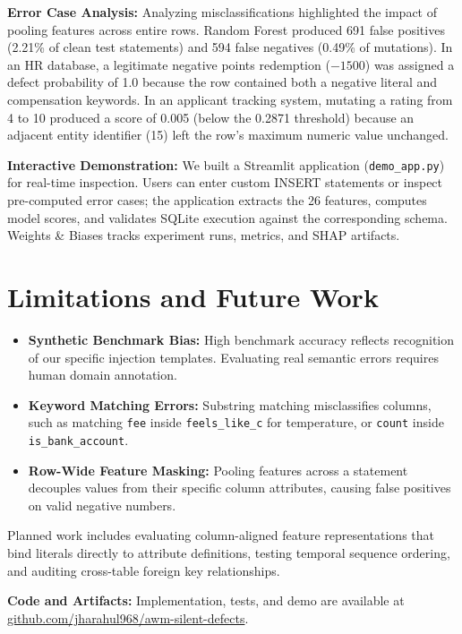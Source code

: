 \documentclass[conference]{IEEEtran}
\begin{document}
\textbf{Error Case Analysis:} Analyzing misclassifications highlighted the impact of pooling features across entire rows. Random Forest produced 691 false positives (2.21\% of clean test statements) and 594 false negatives (0.49\% of mutations). In an HR database, a legitimate negative points redemption ($-1500$) was assigned a defect probability of 1.0 because the row contained both a negative literal and compensation keywords. In an applicant tracking system, mutating a rating from 4 to 10 produced a score of 0.005 (below the 0.2871 threshold) because an adjacent entity identifier (15) left the row's maximum numeric value unchanged.

\textbf{Interactive Demonstration:} We built a Streamlit application (\texttt{demo\_app.py}) for real-time inspection. Users can enter custom INSERT statements or inspect pre-computed error cases; the application extracts the 26 features, computes model scores, and validates SQLite execution against the corresponding schema. Weights \& Biases tracks experiment runs, metrics, and SHAP artifacts.

\section{Limitations and Future Work}
\begin{itemize}
    \item \textbf{Synthetic Benchmark Bias:} High benchmark accuracy reflects recognition of our specific injection templates. Evaluating real semantic errors requires human domain annotation.
    \item \textbf{Keyword Matching Errors:} Substring matching misclassifies columns, such as matching \texttt{fee} inside \texttt{feels\_like\_c} for temperature, or \texttt{count} inside \texttt{is\_bank\_account}.
    \item \textbf{Row-Wide Feature Masking:} Pooling features across a statement decouples values from their specific column attributes, causing false positives on valid negative numbers.
\end{itemize}
Planned work includes evaluating column-aligned feature representations that bind literals directly to attribute definitions, testing temporal sequence ordering, and auditing cross-table foreign key relationships.

\textbf{Code and Artifacts:} Implementation, tests, and demo are available at \href{https://github.com/jharahul968/awm-silent-defects}{github.com/jharahul968/awm-silent-defects}.
\end{document}
